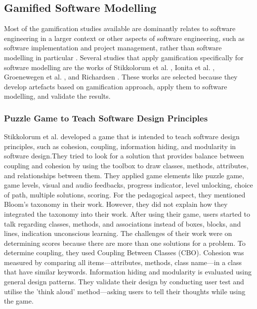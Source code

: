 \documentclass[12pt, a4paper]{report}
\begin{document}
\subsection{Gamified Software Modelling}
Most of the gamification studies available are dominantly relates to software engineering in a larger context or other aspects of software engineering, such as software implementation and project management, rather than software modelling in particular \cite{Pedreira2015}. Several studies that apply gamification specifically for software modelling are the works of Stikkolorum et al. \cite{Stikkolorum2014}, Ionita et al. \cite{Ionita2015}, Groenewegen et al. \cite{Groenewegen2010}, and Richardsen \cite{Richardsen2014}. These works are selected because they develop artefacts based on gamification approach, apply them to software modelling, and validate the results.

\subsubsection{Puzzle Game to Teach Software Design Principles}
Stikkolorum et al. \cite{Stikkolorum2014} developed a game that is intended to teach software design principles, such as cohesion, coupling, information hiding, and modularity in software design.They tried to look for a solution that provides balance between coupling and cohesion by using the toolbox to draw classes, methods, attributes, and relationships between them. They applied game elements like puzzle game, game levels, visual and audio feedbacks, progress indicator, level unlocking, choice of path, multiple solutions, scoring. For the pedagogical aspect, they mentioned Bloom’s taxonomy in their work. However, they did not explain how they integrated the taxonomy into their work. After using their game, users started to talk regarding classes, methods, and associations instead of boxes, blocks, and lines, indication unconscious learning. The challenges of their work were on determining scores because there are more than one solutions for a problem. To determine coupling, they used Coupling Between Classes (CBO). Cohesion was measured by comparing all items—attributes, methods, class name—in a class that have similar keywords. Information hiding and modularity is evaluated using general design patterns. They validate their design by conducting user test and utilise the 'think aloud' method—asking users to tell their thoughts while using the game. 
\end{document}
